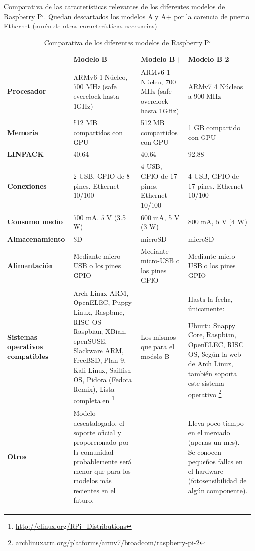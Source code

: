 Comparativa de las características relevantes de los diferentes modelos de Raspberry Pi.
Quedan descartados los modelos A y A+ por la carencia de puerto Ethernet (amén de otras características necesarias).
\begin{landscape}
\begin{table}[h]
\begin{tabular}{|p{3.2cm}|p{6cm}|p{6cm}|p{6cm}|}
\hline
 & \textbf{Modelo B} & \textbf{Modelo B+} & \textbf{Modelo B 2}\\ \hline
\textbf{Procesador} & ARMv6 1 Núcleo, 700 MHz (safe overclock hasta 1GHz) & ARMv6 1 Núcleo, 700 MHz (safe overclock hasta 1GHz) & ARMv7 4 Núcleos a 900 MHz \\ \hline
\textbf{Memoria} & 512 MB compartidos con GPU & 512 MB compartidos con GPU & 1 GB compartido con GPU\\ \hline
\textbf{LINPACK} \cite{hackaday:benchmarkpi2,gist:linpackbenchmark,elinux:benchmark} & 40.64 & 40.64 & 92.88\\ \hline
\textbf{Conexiones} & 2 USB, GPIO de 8 pines. Ethernet 10/100 & 4 USB, GPIO de 17 pines. Ethernet 10/100 & 4 USB, GPIO de 17 pines. Ethernet 10/100\\ \hline
\textbf{Consumo medio} & 700 mA, 5 V (3.5 W) & 600 mA, 5 V (3 W) & 800 mA, 5 V (4 W)\\ \hline
\textbf{Almacenamiento} & SD & microSD & microSD\\ \hline
\textbf{Alimentación} & Mediante micro-USB o los pines GPIO & Mediante micro-USB o los pines GPIO &Mediante micro-USB o los pines GPIO\\ \hline
\textbf{Sistemas operativos compatibles} & 

Arch Linux ARM, OpenELEC, Puppy Linux, Raspbmc, RISC OS, Raspbian, XBian, openSUSE, Slackware ARM, FreeBSD, Plan 9, Kali Linux, Sailfish OS, Pidora (Fedora Remix), Lista completa en \footnote{\href{http://elinux.org/RPi\_Distributions}{http://elinux.org/RPi\_Distributions}} & Los mismos que para el modelo B & Hasta la fecha, únicamente:

Ubuntu Snappy Core, Raspbian, OpenELEC, RISC OS, Según la web de Arch Linux, también soporta este sistema operativo \footnote{\href{http://archlinuxarm.org/platforms/armv7/broadcom/raspberry-pi-2}{archlinuxarm.org/platforms/armv7/broadcom/raspberry-pi-2}} \\

\hline %

\textbf{Otros} & Modelo descatalogado, el soporte oficial y proporcionado por la comunidad probablemente será menor que para los modelos más recientes en el futuro. &  & Lleva poco tiempo en el mercado (apenas un mes). Se conocen pequeños fallos en el hardware (fotosensibilidad de algún componente).\\ \hline

\end{tabular}
\caption{Comparativa de los diferentes modelos de Raspberry Pi}
\end{table}
\end{landscape}


